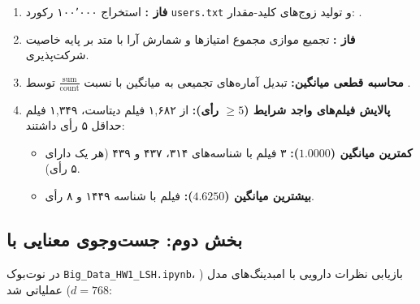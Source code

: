 \documentclass[11pt,a4paper]{article}
\begin{document}
	\begin{tcolorbox}[primarycard, before skip=3pt, after skip=4pt, top=3pt, bottom=3pt, title={گام‌های اجرایی و نتایج پایپ‌لاین در \lr{PySpark}}]
		\small
		\begin{enumerate}[noitemsep, topsep=1pt]
			\item \textbf{فاز :} استخراج ۱۰۰٬۰۰۰ رکورد \texttt{users.txt} و تولید زوج‌های کلید-مقدار: \mbox{}.
			\item \textbf{فاز :} تجمیع موازی مجموع امتیازها و شمارش آرا با متد  بر پایه خاصیت شرکت‌پذیری.
			\item \textbf{محاسبه قطعی میانگین:} تبدیل آماره‌های تجمیعی به میانگین با نسبت $\frac{\text{sum}}{\text{count}}$ توسط .
			\item \textbf{پالایش فیلم‌های واجد شرایط ($\ge 5$ رأی):}
			از ۱,۶۸۲ فیلم دیتاست، ۱,۳۴۹ فیلم حداقل ۵ رأی داشتند:
			\begin{itemize}[noitemsep, topsep=1pt]
				\item \textbf{کمترین میانگین ($1.0000$):} ۳ فیلم با شناسه‌های ۳۱۴، ۴۳۷ و ۴۳۹ (هر یک دارای ۵ رأی).
				\item \textbf{بیشترین میانگین ($4.6250$):} فیلم  با شناسه ۱۴۴۹ و ۸ رأی.
			\end{itemize}
		\end{enumerate}
	\end{tcolorbox}
	
	\subsection{بخش دوم: جست‌وجوی معنایی با }
	در نوت‌بوک \texttt{Big\_Data\_HW1\_LSH.ipynb}، بازیابی نظرات دارویی با امبدینگ‌های مدل  ($d=768$) عملیاتی شد:
	
\end{document}
